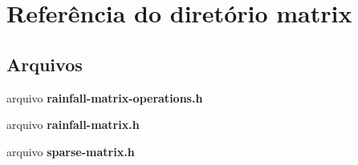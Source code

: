 \section{Referência do diretório matrix}
\label{dir_b683c75709dc3af5d855b963a28c1d61}
\subsection*{Arquivos}
\begin{DoxyCompactItemize}
\item 
arquivo {\bf rainfall-\/matrix-\/operations.\+h}
\item 
arquivo {\bf rainfall-\/matrix.\+h}
\item 
arquivo {\bf sparse-\/matrix.\+h}
\end{DoxyCompactItemize}
